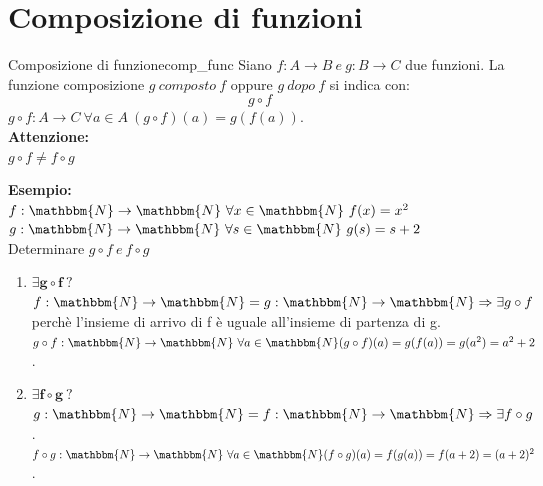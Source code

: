 \documentclass[12pt, letterpaper]{report}
\newcounter{definition}
\newcommand{\nmu}{}
\begin{document}
	\section{Composizione di funzioni}
	\begin{definition}{\nmu Composizione di funzione}{comp_func}
		Siano $f: A \to B \ e \ g: B \to C$ due funzioni. La funzione composizione $g \ composto \ f$ oppure $g \ dopo \ f$ si indica con:
		\[
		g \circ f
		\]
	$g \circ f: A \to C \ \forall a \in A \ (g \circ f)(a) = g(f(a))$.
	\\
	\textbf{Attenzione: }
	\\
	$g \circ f \neq f \circ g$
	\end{definition}
	\textbf{Esempio: }
	\\
	$f: \mathbbm{N} \to \mathbbm{N} \ \forall x \in \mathbbm{N} \ f(x) = x^2$
	\\
	$g: \mathbbm{N} \to \mathbbm{N} \ \forall s \in \mathbbm{N} \ g(s) = s + 2$
	\\
	Determinare $g \circ f \ e \ f \circ g$
	\begin{enumerate}
		\item $\mathbf{\exists g \circ f \ ?}$ \\ $f: \mathbbm{N} \to \mathbbm{N} = g: \mathbbm{N} \to \mathbbm{N} \Rightarrow \exists g \circ f$ perchè l'insieme di arrivo di f è uguale all'insieme di partenza di g.
		\\
		$g \circ f: \mathbbm{N} \to \mathbbm{N} \ \forall a \in \mathbbm{N} \\ (g \circ f)(a) = g(f(a)) = g(a^2) = a^2 + 2$.
		\item $\mathbf{\exists f \circ g \ ?}$ \\ 	$g: \mathbbm{N} \to \mathbbm{N} = f: \mathbbm{N} \to \mathbbm{N} \Rightarrow \exists f \circ g$.
		\\
		$f \circ g : \mathbbm{N} \to \mathbbm{N} \ \forall a \in \mathbbm{N} \\ (f \circ g)(a) = f(g(a)) = f(a + 2) = (a + 2)^2$.
	\end{enumerate}
\end{document}
